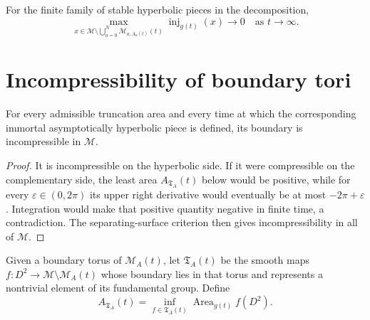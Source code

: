 \begin{claim}
\label{ex:chow-iv-collapsed-complement-injectivity-zero}
For the finite family of stable hyperbolic pieces in the decomposition,
\[
 \max_{x\in\mathcal M\setminus\bigcup_{a=0}^N\mathcal M_{a,A_a(t)}(t)}
 \operatorname{inj}_{g(t)}(x)\longrightarrow0
 \quad\text{as }t\to\infty.
\]
\end{claim}

\section{Incompressibility of boundary tori}

\begin{theorem}
\label{thm:chow-iv-immortal-piece-boundary-incompressible}
For every admissible truncation area and every time at which the corresponding
immortal asymptotically hyperbolic piece is defined, its boundary is
incompressible in \(\mathcal M\).
\end{theorem}

\begin{proof}
It is incompressible on the hyperbolic side.  If it were compressible on the
complementary side, the least area \(A_{\mathfrak T_A}(t)\) below would be
positive, while for every \(\varepsilon\in(0,2\pi)\) its upper right derivative
would eventually be at most \(-2\pi+\varepsilon\).  Integration would make
that positive quantity negative in finite time, a contradiction.  The
separating-surface criterion then gives incompressibility in all of
\(\mathcal M\).
\end{proof}

\begin{definition}
\label{def:chow-iv-disk-class-almost-piece}
Given a boundary torus of \(\mathcal M_A(t)\), let
\(\mathfrak T_A(t)\) be the smooth maps \(f:D^2\to\mathcal M\setminus
\mathcal M_A(t)\) whose boundary lies in that torus and represents a nontrivial
element of its fundamental group.  Define
\[
 A_{\mathfrak T_A}(t)=\inf_{f\in\mathfrak T_A(t)}
 \operatorname{Area}_{g(t)}f(D^2).
\]
\end{definition}

